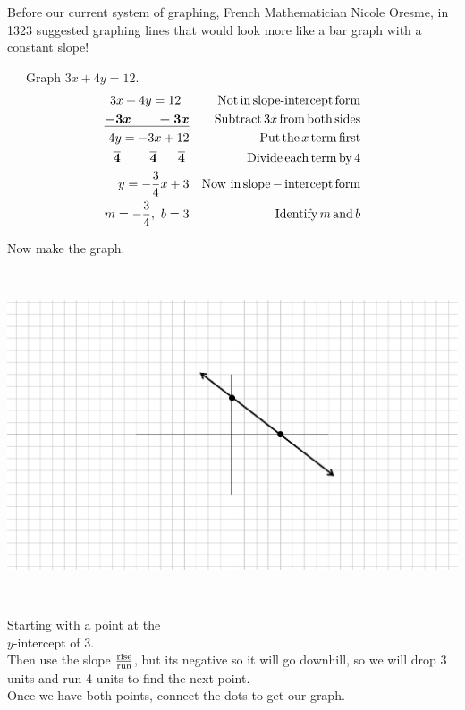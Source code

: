 \pp

 {} Before our current system of graphing, French
Mathematician Nicole Oresme, in 1323 suggested graphing lines that would look
more like a bar graph with a constant slope!\pp

\begin{example}\label{Lin60}~~~Graph $3x+4y=12$.
  \begin{eqnarray*}
    3 x + 4 y = 12~~ &  & \operatorname{Not} \operatorname{in} \operatorname{slope-intercept} \operatorname{form}\\
    \boldsymbol{\underline{- 3 x ~~~~~~- 3 x}} &  & \operatorname{Subtract} 3 x \operatorname{from} \operatorname{both}
    \operatorname{sides}\\
    4 y = - 3 x + 12 &  & \operatorname{Put} \operatorname{the} x \operatorname{term} \operatorname{first}\\
    \boldsymbol{\overline{4} ~~~~~~~ \overline{4} ~~~~~ \overline{4}}~ &  & \operatorname{Divide} \operatorname{each}
    \operatorname{term} \operatorname{by} 4\\
    y = - \frac{3}{4} x + 3 &  & \operatorname{Now~in} \operatorname{slope} - \operatorname{intercept}
    \operatorname{form}\\
    m = - \frac{3}{4},~ b = 3 &  & \operatorname{Identify} m \operatorname{and} b
  \end{eqnarray*}
  \begin{center}
Now make the graph.
	\end{center}
\end{example}
  \begin{multicols}{2}
	~\par
    \includegraphics[scale=.9,bb = 115 65 310 190, clip=true]{II_1_4a-3.eps}
    
    \
    
     Starting with a point at the \\$y$-intercept of $3$.\\
    
 Then use the slope $\frac{\operatorname{rise}}{\operatorname{run}}$, but its negative so
    it will go downhill, so we will drop 3 units and run 4 units to find the
    next point.\\
    
     Once we have both points, connect the dots to get our graph.
  \end{multicols}

